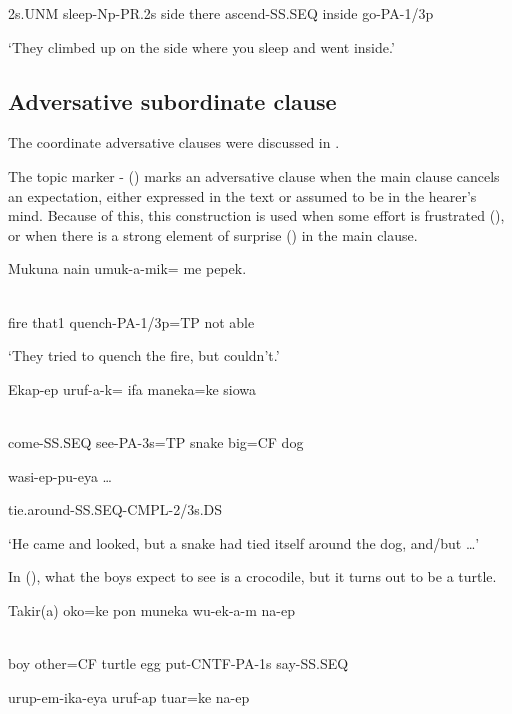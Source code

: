 2s.UNM  sleep-Np-PR.2s  side  there  ascend-SS.SEQ  inside  go-PA-1/3p

`They climbed up on the side where you sleep and went inside.'

\subsection{Adversative subordinate clause } 
\hypertarget{RefHeading23681935131865}{}
The coordinate adversative clauses were discussed in .

The topic marker - () marks an adversative clause when the main clause cancels an expectation, either expressed in the text or assumed to be in the hearer's mind. Because of this, this construction is used when some effort is frustrated (), or when there is a strong element of surprise () in the main clause. 

\ea%
\label{ex:x729}
\gll Mukuna  nain  umuk-a-mik=  me  pepek. \\
      \\
\glt
\z

fire  that1  quench-PA-1/3p=TP  not  able

`They tried to quench the fire, but couldn't.'

\ea%
\label{ex:x730}
\gll Ekap-ep  uruf-a-k=  ifa  maneka=ke  siowa  \\
      \\
\glt
\z

come-SS.SEQ  see-PA-3s=TP  snake  big=CF  dog  

wasi-ep-pu-eya {\dots}

tie.around-SS.SEQ-CMPL-2/3s.DS

`He came and looked, but a snake had tied itself around the dog, and/but {\dots}'

In (), what the boys expect to see is a crocodile, but it turns out to be a turtle.

\ea%
\label{ex:x1393}
\gll Takir(a)  oko=ke  pon  muneka  wu-ek-a-m  na-ep \\
      \\
\glt
\z

boy  other=CF  turtle  egg  put-CNTF-PA-1s  say-SS.SEQ

urup-em-ika-eya  uruf-ap  tuar=ke  na-ep

